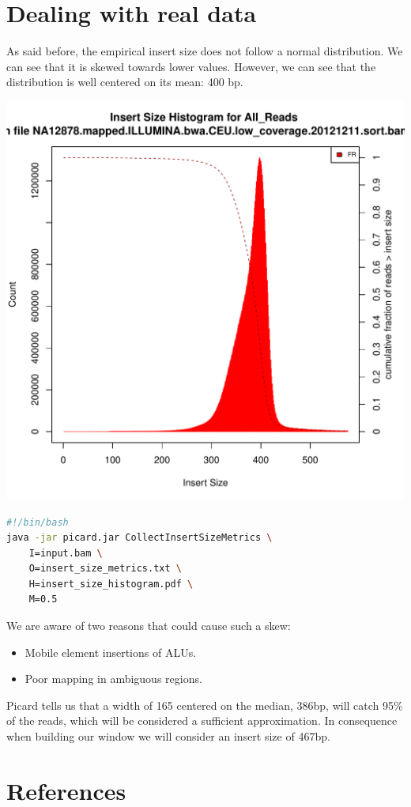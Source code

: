 \documentclass{article}
\begin{document}
\section{Dealing with real data}

As said before, the empirical insert size does not follow a normal distribution. We can see that it is skewed towards lower values. However, we can see that the distribution is well centered on its mean: 400 bp.

\includegraphics[width=\textwidth]{insert_size_histogram}

\begin{lstlisting}[language=bash,caption={Picard command}]
#!/bin/bash
java -jar picard.jar CollectInsertSizeMetrics \
    I=input.bam \
    O=insert_size_metrics.txt \
    H=insert_size_histogram.pdf \
    M=0.5
\end{lstlisting}

We are aware of two reasons that could cause such a skew:
\begin{itemize}
    \item Mobile element insertions of ALUs.
    \item Poor mapping in ambiguous regions.
\end{itemize}

Picard tells us that a width of 165 centered on the median, 386bp, will catch 95\% of the reads,
which will be considered a sufficient approximation. In consequence when building our window we will
consider an insert size of 467bp.

\section*{References}

{}

\end{document}
